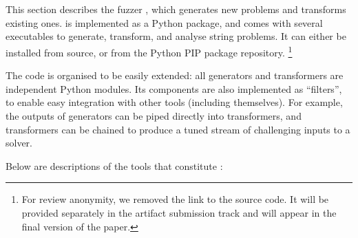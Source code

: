\section{\fuzzer{}}
\label{sec:fuzzer}

    This section describes the fuzzer \fuzzer{}, which generates new \smtfull{} problems and transforms existing ones. \fuzzer{} is implemented as a Python package, and comes with several executables to generate, transform, and analyse \smtfull{} string problems. It can either be installed from source, or from the Python PIP package repository. \footnote{For review anonymity, we removed the link to the source code. It will be provided separately in the artifact submission track and will appear in the final version of the paper.}

    The \fuzzer{} code is organised to be easily extended: all generators and transformers are independent Python modules. Its components are also implemented as \unix{} ``filters'', to enable easy integration with other tools (including themselves). For example, the outputs of generators can be piped directly into transformers, and transformers can be chained to produce a tuned stream of challenging inputs to a solver.

    Below are descriptions of the tools that constitute \fuzzer{}:


